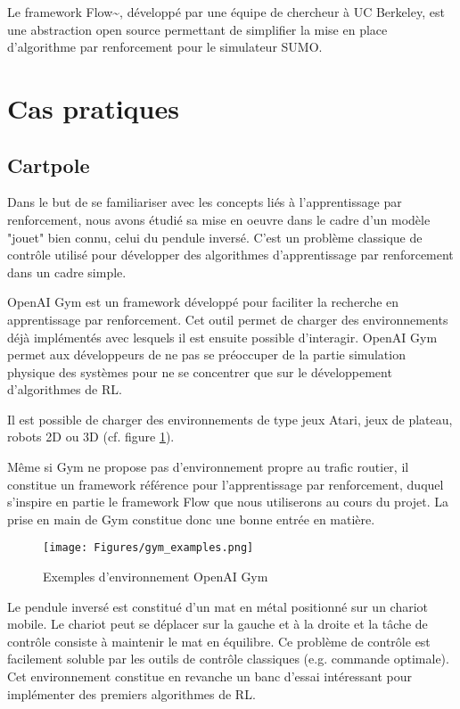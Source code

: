 \documentclass[11pt]{article}
\begin{document}
Le framework Flow\textasciitilde{}\cite{Wu-al17}, développé par une équipe de chercheur à UC Berkeley, est une abstraction open source permettant de simplifier la mise en place d'algorithme par renforcement pour le simulateur SUMO.


\section{Cas pratiques}
\label{sec:org1863bd1}

\subsection{Cartpole}
\label{sec:org030d211}

Dans le but de se familiariser avec les concepts liés à l'apprentissage par renforcement, nous avons étudié sa mise en oeuvre dans le cadre d'un modèle "jouet" bien connu, celui du pendule inversé. C'est un problème classique de contrôle utilisé pour développer des algorithmes d'apprentissage par renforcement dans un cadre simple.

OpenAI Gym \cite{Bro-al16} est un framework développé pour faciliter la recherche en apprentissage par renforcement. Cet outil permet de charger des environnements déjà implémentés avec lesquels il est ensuite possible d'interagir. OpenAI Gym permet aux développeurs de ne pas se préoccuper de la partie simulation physique des systèmes pour ne se concentrer que sur le développement d'algorithmes de RL.

Il est possible de charger des environnements de type jeux Atari, jeux de plateau, robots 2D ou 3D (cf. figure \ref{fig:sumo-envs}).

Même si Gym ne propose pas d'environnement propre au trafic routier, il constitue un framework référence pour l'apprentissage par renforcement, duquel s'inspire en partie le framework Flow que nous utiliserons au cours du projet. La prise en main de Gym constitue donc une bonne entrée en matière.

\begin{latex}
\begin{figure}[ht]
\centering
\texttt{[image: Figures/gym\_examples.png]}
\caption[sumo-envs]{Exemples d'environnement OpenAI Gym}
\label{fig:sumo-envs}
\end{figure}
\end{latex}


Le pendule inversé est constitué d'un mat en métal positionné sur un chariot mobile. Le chariot peut se déplacer sur la gauche et à la droite et la tâche de contrôle consiste à maintenir le mat en  équilibre. Ce problème de contrôle est facilement soluble par les outils de contrôle classiques (e.g. commande optimale). Cet environnement constitue en revanche un banc d'essai intéressant pour implémenter des premiers algorithmes de RL.
\end{document}
